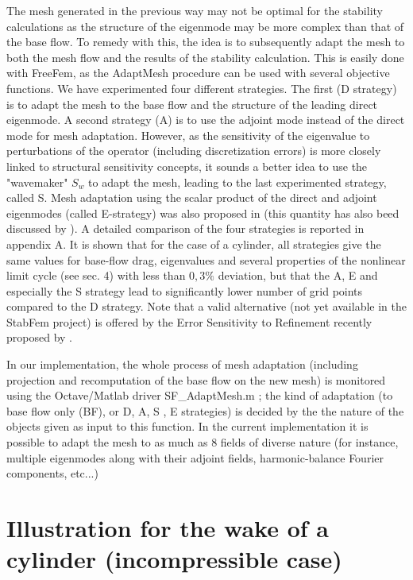 \documentclass[twocolumn,10pt]{asme2ej}
\begin{document}
The mesh generated in the previous way may not be optimal for the stability calculations as the structure of the eigenmode may be more complex than that of the base flow. To remedy with this, the idea is to subsequently adapt the mesh to both the mesh flow and the results of the stability calculation. This is easily done with FreeFem, as the  AdaptMesh procedure can be used with several objective functions. We have experimented four different strategies. The first (D strategy) is to adapt the mesh to the base flow and the structure of the leading direct eigenmode. A second strategy (A) is to use the adjoint mode instead of the direct mode for mesh adaptation. However, as the sensitivity of the eigenvalue to perturbations of the operator (including discretization errors) is more closely linked to structural sensitivity concepts, it sounds a better idea to use the "wavemaker" $S_w$ to adapt the mesh, leading to the last experimented strategy, called S. 
Mesh adaptation using the scalar product of the direct and adjoint eigenmodes  (called E-strategy) was also proposed in \cite{mavripilis2015adjoint} (this quantity has also beed discussed by \cite{marquet2015endogeneity}). A detailed comparison of the four strategies is reported in appendix A. It is shown that for the case of a cylinder, all strategies give the same values for base-flow drag, eigenvalues and several properties of the nonlinear limit cycle (see sec. 4) with less than $0,3\%$ deviation, but that the A, E and especially the S strategy lead to significantly lower number of grid points compared to the D strategy. 
Note that a valid alternative (not yet available in the StabFem  project) is offered by the Error Sensitivity to Refinement recently proposed by \cite{Luchini2017}. 




In our implementation, the whole process of mesh adaptation (including projection and recomputation of the base flow on the new mesh) is monitored using the Octave/Matlab driver {\sf  SF\_AdaptMesh.m} ; the kind of adaptation  (to base flow only (BF), or D, A, S , E strategies) is decided by the the nature of the objects given as input to this function. In the current implementation it is possible to adapt the mesh to as much as 8 fields of diverse nature (for instance, multiple eigenmodes along with their adjoint fields, harmonic-balance Fourier components, etc...)


\section{Illustration for the wake of a cylinder (incompressible case)}  
\vspace{.2cm}
\end{document}
